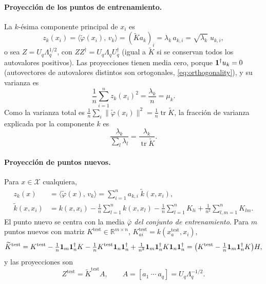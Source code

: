 \documentclass[11pt,a4paper]{article}
\newcommand{\R}{\mathbb{R}}
\newcommand{\X}{\mathcal{X}}
\newcommand{\dg}{\dagger}                         %
\newcommand{\Kc}{\widetilde{K}}                   %
\newcommand{\inner}[2]{\langle #1,\, #2\rangle}
\newcommand{\norm}[1]{\lVert #1\rVert}
\DeclareMathOperator{\tr}{tr}
\theoremstyle{plain}
\theoremstyle{definition}
\theoremstyle{remark}
\numberwithin{equation}{section}
\begin{document}
\paragraph{Proyección de los puntos de entrenamiento.} La $k$-ésima componente principal de
$x_i$ es
\begin{equation}\label{eq:kpca-train-projection}
  z_k(x_i)=\inner{\tilde\varphi(x_i)}{v_k}=(\Kc a_k)_i=\lambda_k\,a_{k,i}
  =\sqrt{\lambda_k}\;u_{k,i},
\end{equation}
o sea $Z=U_q\Lambda_q^{1/2}$, con $ZZ^{\dg}=U_q\Lambda_qU_q^{\dg}$ (igual a $\Kc$ si se
conservan todos los autovalores positivos). Las proyecciones tienen media cero, porque
$\ones^{\dg}u_k=0$ (autovectores de autovalores distintos son ortogonales,
\eqref{eq:orthogonality}), y su varianza es
\begin{equation}\label{eq:kpca-variance}
  \frac1n\sum_{i=1}^nz_k(x_i)^2=\frac{\lambda_k}{n}=\mu_k .
\end{equation}
Como la varianza total es $\frac1n\sum_i\norm{\tilde\varphi(x_i)}^2=\frac1n\tr\Kc$, la
fracción de varianza explicada por la componente $k$ es
\begin{equation}\label{eq:explained-variance}
  \frac{\lambda_k}{\sum_l\lambda_l}=\frac{\lambda_k}{\tr\Kc} .
\end{equation}

\paragraph{Proyección de puntos nuevos.} Para $x\in\X$ cualquiera,
\begin{equation}\label{eq:kpca-new-point}
  \begin{aligned}
  z_k(x)&=\inner{\tilde\varphi(x)}{v_k}=\sum_{i=1}^na_{k,i}\;\tilde k(x,x_i),\\
  \tilde k(x,x_i)&=k(x,x_i)-\frac1n\sum_{l=1}^nk(x,x_l)-\frac1n\sum_{l=1}^nK_{li}
  +\frac1{n^2}\sum_{l,m=1}^nK_{lm} .
  \end{aligned}
\end{equation}
El punto nuevo se centra con la media $\bar\varphi$ \emph{del conjunto de entrenamiento}. Para
$m$ puntos nuevos con matriz $K^{\mathrm{test}}\in\R^{m\times n}$,
$K^{\mathrm{test}}_{ai}=k(x^{\mathrm{test}}_a,x_i)$,
\begin{equation}\label{eq:centering-test}
  \Kc^{\mathrm{test}}=K^{\mathrm{test}}-\tfrac1n\ones_m\ones_n^{\dg}K
  -\tfrac1nK^{\mathrm{test}}\ones_n\ones_n^{\dg}
  +\tfrac1{n^2}\ones_m\ones_n^{\dg}K\ones_n\ones_n^{\dg}
  =\bigl(K^{\mathrm{test}}-\tfrac1n\ones_m\ones_n^{\dg}K\bigr)H,
\end{equation}
y las proyecciones son
\begin{equation}\label{eq:kpca-test-projection}
  Z^{\mathrm{test}}=\Kc^{\mathrm{test}}A,\qquad
  A=[a_1\ \cdots\ a_q]=U_q\Lambda_q^{-1/2} .
\end{equation}
\end{document}
